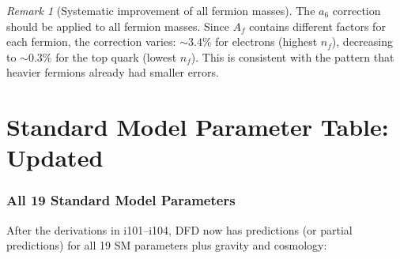 \documentclass[11pt,a4paper]{article}
\theoremstyle{remark}
\newtheorem{remark}[theorem]{Remark}
\begin{document}
\begin{remark}[Systematic improvement of all fermion masses]
The $a_6$ correction should be applied to all fermion masses. Since
$A_f$ contains different factors for each fermion, the correction varies:
$\sim 3.4\%$ for electrons (highest $n_f$), decreasing to $\sim 0.3\%$
for the top quark (lowest $n_f$). This is consistent with the pattern
that heavier fermions already had smaller errors.
\end{remark}


\newpage
\part{Standard Model Parameter Table: Updated}
\label{part:SM-table}

\section{All 19 Standard Model Parameters}

After the derivations in i101--i104, DFD now has predictions (or partial
predictions) for all 19 SM parameters plus gravity and cosmology:
\end{document}
